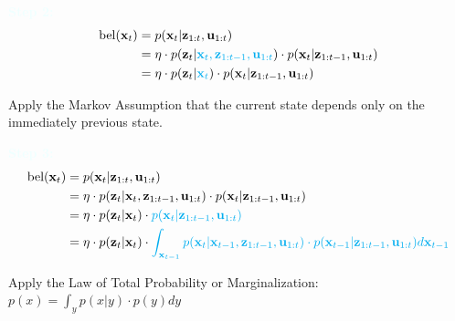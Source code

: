 \documentclass[10pt]{article}
\newcommand{\textbfazure}[1]{\textcolor{azure}{\textbf{#1}}}
\begin{document}
\textbfazure{Step 2:}
\begin{equation}
	\begin{aligned}
		\text{bel}(\mathbf{x}_{t}) & = p( \mathbf{x}_{t}  | \mathbf{z}_{1:t}, \mathbf{u}_{1:t}) \\
		& = \eta \cdot p(\mathbf{z}_{t} |  {\color{Cyan} \mathbf{x}_{t}, \mathbf{z}_{1:t-1}, \mathbf{u}_{1:t} } ) \cdot p( \mathbf{x}_{t} | \mathbf{z}_{1:t-1}, \mathbf{u}_{1:t}) \\
		& = \eta \cdot p(\mathbf{z}_{t} |  {\color{Cyan} \mathbf{x}_{t} } ) \cdot p( \mathbf{x}_{t} | \mathbf{z}_{1:t-1}, \mathbf{u}_{1:t}) \\
	\end{aligned} 
\end{equation} 

Apply the Markov Assumption that the current state depends only on the immediately previous state.

\textbfazure{Step 3:}
\begin{equation}
	\begin{aligned}
		\text{bel}(\mathbf{x}_{t}) & = p( \mathbf{x}_{t}  | \mathbf{z}_{1:t}, \mathbf{u}_{1:t}) \\
		& = \eta \cdot p(\mathbf{z}_{t} |  \mathbf{x}_{t}, \mathbf{z}_{1:t-1}, \mathbf{u}_{1:t}) \cdot p( \mathbf{x}_{t} | \mathbf{z}_{1:t-1}, \mathbf{u}_{1:t}) \\
		& = \eta \cdot p(\mathbf{z}_{t} |  \mathbf{x}_{t}) \cdot {\color{Cyan} p( \mathbf{x}_{t} | \mathbf{z}_{1:t-1}, \mathbf{u}_{1:t}) } \\
		& = \eta \cdot p(\mathbf{z}_{t} |  \mathbf{x}_{t}) \cdot {\color{Cyan}  \int_{\mathbf{x}_{t-1}} p( \mathbf{x}_{t} | \mathbf{x}_{t-1},\mathbf{z}_{1:t-1}, \mathbf{u}_{1:t}) \cdot p(\mathbf{x}_{t-1} | \mathbf{z}_{1:t-1}, \mathbf{u}_{1:t}) d\mathbf{x}_{t-1} } \\
	\end{aligned} 
\end{equation}

Apply the Law of Total Probability or Marginalization: $p(x) = \int_{y} p(x|y) \cdot p(y) dy$
\end{document}
